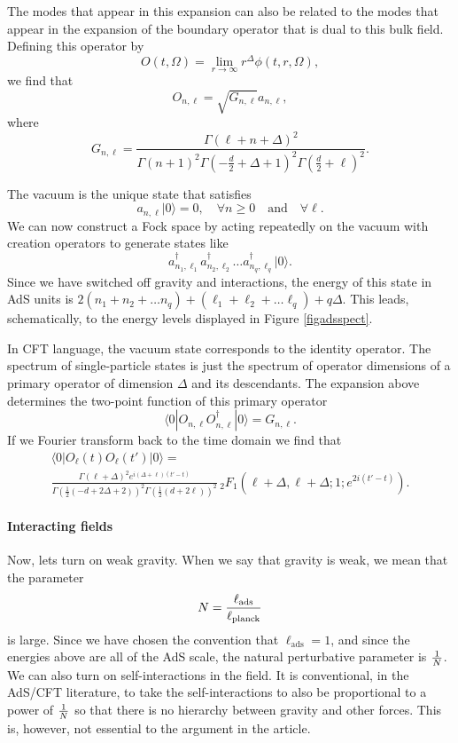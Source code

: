 \documentclass[12pt]{article}
\newcommand{\be}{\begin{equation}}
\newcommand{\ee}{\end{equation}}
\begin{document}
The modes that appear in this expansion can also be related to the modes that appear in the expansion of the boundary operator that is dual to this bulk field. Defining this operator by
\be
O(t, \Omega) = \lim_{r \rightarrow \infty} r^{\Delta} \phi(t, r, \Omega),
\ee
we find that
\be
O_{n, \ell} = \sqrt{G_{n, \ell}} a_{n, \ell},
\ee
where
\be
G_{n, \ell} = \frac{\Gamma (\ell+n+\Delta )^2}{\Gamma (n+1)^2 \Gamma \left(-\frac{d}{2}+\Delta +1\right)^2 \Gamma \left(\frac{d}{2}+\ell\right)^2}.
\ee


The vacuum is the unique state that satisfies
\be
a_{n, \ell} | 0 \rangle = 0, \quad \forall n \geq 0 \quad \text{and} \quad \forall \ell.
\ee
We can now construct a Fock space  by acting repeatedly on the vacuum
with creation operators to generate states like
\[
a_{n_1, \ell_1}^{\dagger} a_{n_2, \ell_2}^{\dagger} \ldots a_{n_q, \ell_q}^{\dagger} | 0 \rangle.
\]
Since we have switched off gravity and interactions, the energy of this state in AdS units is   $2 (n_1 + n_2 + \ldots n_q) + (\ell_1 + \ell_2 + \ldots \ell_q) + q \Delta$. This leads, schematically, to the energy levels displayed in Figure \ref{figadsspect}.

In CFT language, the vacuum state corresponds to the identity operator. The spectrum of single-particle states is just the spectrum of operator dimensions of a primary operator of dimension $\Delta$ and its descendants. The expansion above determines the two-point function of this primary operator
\be
\langle 0| O_{n, \ell} O_{n, \ell}^{\dagger} | 0 \rangle = G_{n, \ell}.
\ee
If we Fourier transform back to the time domain we find that
\begin{multline}
\langle 0| O_{\ell}(t) O_{\ell}(t') | 0 \rangle = \\ 
\frac{\Gamma (\ell+\Delta )^2 e^{i(\Delta +\ell)(t' - t)} }{\Gamma \left(\frac{1}{2} (-d+2 \Delta +2)\right)^2 \Gamma \left(\frac{1}{2} (d+2 \ell)\right)^2} \, _2F_1\left(\ell+\Delta ,\ell+\Delta ;1;e^{2 i (t' - t)}\right).
\end{multline}




\paragraph{\bf Interacting fields \\}
Now, lets turn on weak gravity. When we say that gravity is weak, we mean that the parameter
\be
N = {\ell_{\text{ads}} \over \ell_{\text{planck}}} 
\ee
is large. Since we have chosen the convention that $\ell_{\text{ads}} = 1$, and since the energies above are all of the AdS scale, the natural perturbative parameter is ${1 \over N}$.  We can also turn on self-interactions in the field. It is conventional, in the AdS/CFT literature, to take the self-interactions to also be proportional to a power of ${1 \over N}$ so that there is no hierarchy between gravity and other forces. This is, however, not essential to the argument in the article.
\end{document}
